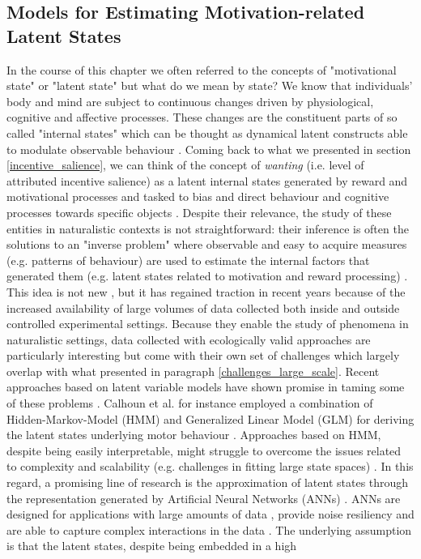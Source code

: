 \subsection{Models for Estimating Motivation-related Latent States}
\label{latent_states_estimation}
In the course of this chapter we often referred to the concepts of "motivational state" or "latent state" but what do we mean by state? We know that individuals' body and mind are subject to continuous changes driven by physiological, cognitive and affective processes. These changes are the constituent parts of so called "internal states"  which can be thought as dynamical latent constructs able to modulate observable behaviour \cite{eyjolfsdottir2016learning,song2017reward,merel2019deep,calhoun2019unsupervised}. Coming back to what we presented in section \ref{incentive_salience}, we can think of the concept of \textit{wanting} (i.e. level of attributed incentive salience) as a latent internal states generated by reward and motivational processes and tasked to bias and direct behaviour and cognitive processes towards specific objects \cite{berridge2008affective}. Despite their relevance, the study of these entities in naturalistic contexts is not straightforward: their inference is often the solutions to an "inverse problem" \cite{bishop2006pattern} where observable and easy to acquire measures (e.g. patterns of behaviour) are used to estimate the internal factors that generated them (e.g. latent states related to motivation and reward processing) \cite{song2017reward,wang2018prefrontal}. This idea is not new \cite{spearman1961general}, but it has regained traction in recent years because of the increased availability of large volumes of data collected both inside and outside controlled experimental settings. Because they enable the study of phenomena in naturalistic settings, data collected with ecologically valid approaches are particularly interesting but come with their own set of challenges \cite{hashem2015rise} which largely overlap with what presented in paragraph \ref{challenges_large_scale}. Recent approaches based on latent variable models have shown promise in taming some of these problems \cite{calhoun2019unsupervised}. Calhoun et al. for instance employed a combination of Hidden-Markov-Model (HMM) and Generalized Linear Model (GLM) for deriving the latent states underlying motor behaviour \cite{calhoun2019unsupervised}. Approaches based on HMM, despite being easily interpretable, might struggle to overcome the issues related to complexity  \cite{eyjolfsdottir2016learning,schuster2007introduction} and scalability (e.g. challenges in fitting large state spaces) \cite{touloupou2020scalable}. In this regard, a promising line of research is the approximation of latent states through the representation generated by Artificial Neural Networks (ANNs) \cite{eyjolfsdottir2016learning,song2017reward,merel2019deep,luxem2020identifying, pereira2020quantifying, mccullough2021unsupervised, shi2021learning}. ANNs are designed for applications with large amounts of data \cite{oh2004gpu}, provide noise resiliency and are able to capture complex interactions in the data \cite{bengio2017deep}. The underlying assumption is that the latent states, despite being embedded in a high 